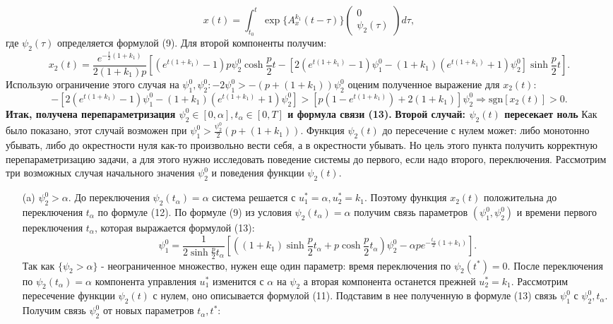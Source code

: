 \documentclass[11pt]{article}
\begin{document}
{ 	\[ x(t) = \int_{t_0}^{t}\exp\{A_x^{k_1}(t - \tau)\}\begin{pmatrix}
 	0\\
 	\psi_2(\tau)
 	\end{pmatrix}d\tau, \]
 	где $\psi_2(\tau)$ определяется формулой (9). Для второй компоненты получим:
 	\begin{equation}
 	x_2(t) = \frac{e^{-\frac{t}{2}(1 + k_1)}}{2(1+k_1)p}[(e^{t(1 + k_1)} - 1)p\psi_2^0\cosh\frac{p}{2}t - [2(e^{t(1 + k_1)} - 1)\psi_1^0 - (1 + k_1)(e^{t(1 + k_1)}+1)\psi_2^0]\sinh\frac{p}{2}t].
 	\end{equation} 
 	Использую ограничение этого случая на $\psi_1^0,\psi_2^0: -2\psi_1^0 > -(p + (1 + k_1))\psi_2^0$ оценим полученное выражение для $x_2(t):$
 	\newcommand{\sgn}{\text{sgn}}
 	\[ -[2(e^{t(1 + k_1)} - 1)\psi_1^0 - (1 + k_1)(e^{t(1 + k_1)} + 1)\psi_2^0] > [p(1 - e^{t(1 + k_1)}) + 2(1 + k_1)]\psi_2^0 \Rightarrow \sgn[x_2(t)] > 0.\]
 	\textbf{Итак, получена перепараметризация $\psi_2^0 \in [0,\alpha], t_{\alpha} \in [0, T]$ и формула связи (13).}
 	\newline
 	\newline
 	\textbf{Второй случай: $\psi_2(t)$ пересекает ноль}
 	\newline
 	{Как было показано, этот случай возможен при $\psi_1^0 > \frac{\psi_2^0}{2}(p + (1 + k_1)).$ Функция $\psi_2(t)$ до пересечение с нулем может: либо монотонно убывать, либо до окрестности нуля как-то произвольно вести себя, а в окрестности убывать. Но цель этого пункта получить корректную перепараметризацию задачи, а для этого нужно исследовать поведение системы до первого, если надо второго, переключения. Рассмотрим три возможных случая начального значения $\psi_2^0$ и поведения функции $\psi_2(t)$.}
 	\begin{itemize}
 		\item [(a)]{$\psi_2^0 > \alpha .$
 		\newline
 		До переключения $\psi_2(t_\alpha)=\alpha$ система решается с $u_1^* = \alpha,u_2^*=k_1$. Поэтому функция $x_2(t)$ положительна до переключения $t_\alpha$ по формуле (12). По формуле (9) из условия $\psi_2(t_\alpha) = \alpha$ получим связь параметров $(\psi_1^0,\psi_2^0)$ и времени первого переключения $t_\alpha$, которая выражается формулой (13):
 		\[ \psi_1^0 = \frac{1}{2\sinh\frac{p}{2}t_{\alpha}}[((1 + k_1)\sinh\frac{p}{2}t_{\alpha} + p\cosh\frac{p}{2}t_{\alpha})\psi_2^0 - \alpha pe^{-\frac{t_{\alpha}}{2}(1 + k_1)}]. \]
 		Так как $\{\psi_2 > \alpha\}$ - неограниченное множество, нужен еще один параметр: время переключения по $\psi_2(t^*) = 0.$ После переключения по $\psi_2(t_\alpha) = \alpha$ компонента управления $u_1^*$ изменится с $\alpha$ на $\psi_2$ а вторая компонента останется прежней $u_2^* = k_1.$ Рассмотрим пересечение функции $\psi_2(t)$ с нулем, оно описывается формулой (11). Подставим в нее полученную в формуле (13) связь $\psi_1^0$ с $\psi_2^0,t_\alpha.$ Получим связь $\psi_2^0$ от новых параметров $t_\alpha,t^*:$
}
\end{itemize}}
\end{document}
